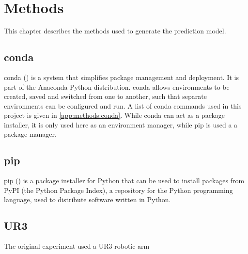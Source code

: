 

\chapter{Methods}
\label{Methods} 

This chapter describes the methods used to generate the prediction model.

\section{conda}


conda (\cite{Conda2021}) is a system that simplifies package management and deployment. It is part of the Anaconda Python distribution. conda allows environments to be created, saved and switched from one to another, such that separate environments can be configured and run. A list of conda commands used in this project is given in \ref{app:methods:conda}. While conda can act as a package installer, it is only used here as an environment manager, while pip is used a a package manager.

\section{pip}

pip (\cite{pip2021}) is a package installer for Python that can be used to install packages from PyPI (the Python Package Index), a repository for the Python programming language, used to distribute software written in Python.

\section{UR3}

The original experiment used a UR3 robotic arm

